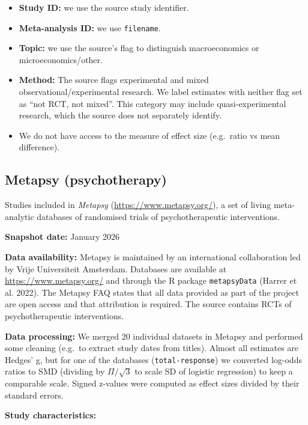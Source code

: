\documentclass[
  11pt,
]{article}
\providecommand{\tightlist}{%
  \setlength{\itemsep}{0pt}\setlength{\parskip}{0pt}}
\begin{document}
\begin{itemize}
\tightlist
\item
  \textbf{Study ID:} we use the source study identifier.
\item
  \textbf{Meta-analysis ID:} we use \texttt{filename}.
\item
  \textbf{Topic:} we use the source's flag to distinguish macroeconomics
  or microeconomics/other.
\item
  \textbf{Method:} The source flags experimental and mixed
  observational/experimental research. We label estimates with neither
  flag set as ``not RCT, not mixed''. This category may include
  quasi-experimental research, which the source does not separately
  identify.
\item
  We do not have access to the measure of effect size (e.g.~ratio vs
  mean difference).
\end{itemize}

\newpage

\subsection{Metapsy (psychotherapy)}\label{metapsy-psychotherapy}

Studies included in \emph{Metapsy} (\url{https://www.metapsy.org/}), a
set of living meta-analytic databases of randomised trials of
psychotherapeutic interventions.

\textbf{Snapshot date:} January 2026

\textbf{Data availability:} Metapsy is maintained by an international
collaboration led by Vrije Universiteit Amsterdam. Databases are
available at \url{https://www.metapsy.org/} and through the R package
\texttt{metapsyData} (Harrer et al. 2022). The Metapsy FAQ states that
all data provided as part of the project are open access and that
attribution is required. The source contains RCTs of psychotherapeutic
interventions.

\textbf{Data processing:} We merged 20 individual datasets in Metapsy
and performed some cleaning (e.g.~to extract study dates from titles).
Almost all estimates are Hedges' g, but for one of the databases
(\texttt{total-response}) we converted log-odds ratios to SMD (dividing
by \(\Pi/\sqrt{3}\) to scale SD of logistic regression) to keep a
comparable scale. Signed z-values were computed as effect sizes divided
by their standard errors.

\textbf{Study characteristics:}
\end{document}
